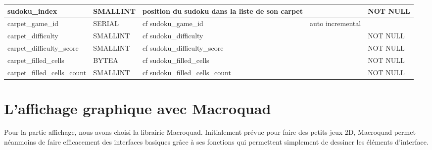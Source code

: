 \documentclass[a4paper]{article}
\begin{document}
{\begin{center}
\begin{tabular}{|>{\centering\arraybackslash}p{4.5cm}|>{\centering\arraybackslash}p{2cm}|>{\centering\arraybackslash}p{5cm}|>{\centering\arraybackslash}p{2.5cm}|>{\centering\arraybackslash}p{2cm}|}
    \hline
    sudoku\_index & SMALLINT & position du sudoku dans la liste de son carpet &                  & NOT NULL \\
    \hline
    carpet\_game\_id & SERIAL & cf sudoku\_game\_id & auto incremental &          \\
    \hline
    carpet\_difficulty & SMALLINT & cf sudoku\_difficulty &                  & NOT NULL \\
    \hline
    carpet\_difficulty\_score & SMALLINT & cf sudoku\_difficulty\_score &                  & NOT NULL \\
    \hline
    carpet\_filled\_cells & BYTEA & cf sudoku\_filled\_cells &                  & NOT NULL \\
    \hline
    carpet\_filled\_cells\_count & SMALLINT & cf sudoku\_filled\_cells\_count &                  & NOT NULL \\
    \hline
    
    \end{tabular}
    \end{center}
}

\newpage
\section{L'affichage graphique avec Macroquad}

\begin{justify}
    \qquad Pour la partie affichage, nous avons choisi la librairie Macroquad. Initialement prévue pour faire des petits jeux 2D, Macroquad permet néanmoins de faire efficacement des interfaces basiques grâce à ses fonctions qui permettent simplement de dessiner les éléments d'interface.
\end{justify}
    
\end{document}
